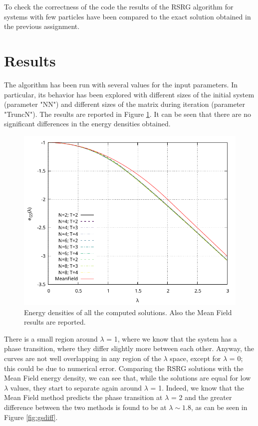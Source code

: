 \documentclass[11pt,a4paper]{article}
\begin{document}
To check the correctness of the code the results of the RSRG algorithm for systems with few particles have been compared to the exact solution obtained in the previous assignment.

\section{Results} %

The algorithm has been run with several values for the input parameters. In particular, its behavior has been explored with different sizes of the initial system (parameter "NN") and different sizes of the matrix during iteration (parameter "TruncN"). 
The results are reported in Figure \ref{fig:gsall}. It can be seen that there are no significant differences in the energy densities obtained. 

\begin{figure}%
	\centering
	\includegraphics[width=0.95\linewidth]{Plots/GroundStatesAll.pdf}
	\caption{Energy densities of all the computed solutions. Also the Mean Field results are reported.}
	\label{fig:gsall}
\end{figure}

There is a small region around $\lambda$ = 1, where we know that the system has a phase transition, where they differ slightly more between each other. 
Anyway, the curves are not well overlapping in any region of the $\lambda$ space, except for $\lambda$ = 0; this could be due to numerical error.
Comparing the RSRG solutions with the Mean Field energy density, we can see that, while the solutions are equal for low $\lambda$ values, they start to separate again around $\lambda$ = 1. 
Indeed, we know that the Mean Field method predicts the phase transition at $\lambda$ = 2 and the greater difference between the two methods is found to be at $\lambda \sim 1.8$, as can be seen in Figure \ref{fig:gsdiff}.
\end{document}
